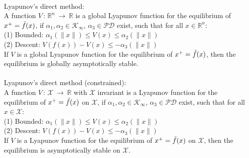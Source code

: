 \documentclass[english]{latex4ei/latex4ei_sheet}
\begin{document}
\begin{sectionbox}
\begin{itemize}
\end{itemize}
\vspace{0.1cm}\\ 
Lyapunov's direct method:\\
A function $V\,:\,\mathbb{R}^{n}\:\rightarrow\:\mathbb{R}$ is a global Lyapunov function for the equilibrium of $x^{+}=\Tilde{f}(x)$, if $\alpha_1,\alpha_2\in\mathcal{K}_{\infty},\,\alpha_3\in\mathcal{PD}$ exist, such that for all $x\in\mathbb{R}^n$:\\
(1) Bounded: $\alpha_{1}(\|x\|) \leq V(x) \leq \alpha_{2}(\|x\|)$ \\ 
(2) Descent: $V(f(x))-V(x) \leq-\alpha_{3}(\|x\|)$\\
If $V$ is a global Lyapunov function for the equilibrium of $x^{+}=\Tilde{f}(x)$, then the equilibrium is globally asymptotically stable.\\
\\
Lyapunov's direct method (constrained):\\
A function $V\,:\,\mathcal{X}\:\rightarrow\:\mathbb{R}$ with $\mathcal{X}$ invariant is a Lyapunov function for the equilibrium of $x^{+}=\Tilde{f}(x)$ on $\mathcal{X}$, if $\alpha_1,\alpha_2\in\mathcal{K}_{\infty},\,\alpha_3\in\mathcal{PD}$ exist, such that for all $x\in\mathcal{X}$:\\
(1) Bounded: $\alpha_{1}(\|x\|) \leq V(x) \leq \alpha_{2}(\|x\|)$ \\ 
(2) Descent: $V(f(x))-V(x) \leq-\alpha_{3}(\|x\|)$\\
If $V$ is a Lyapunov function for the equilibrium of $x^{+}=\Tilde{f}(x)$ on $\mathcal{X}$, then the equilibrium is asymptotically stable on $\mathcal{X}$.\\

\end{sectionbox}
\end{document}

